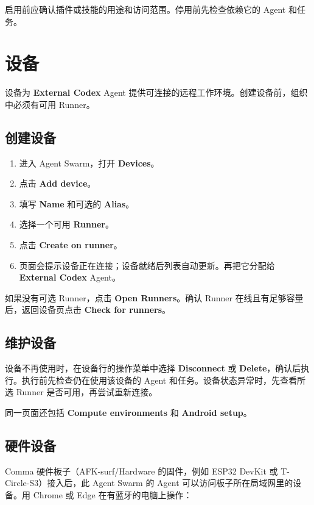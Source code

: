 \documentclass[UTF8,a4paper,11pt]{ctexart}
\begin{document}
启用前应确认插件或技能的用途和访问范围。停用前先检查依赖它的 Agent 和任务。

\section{设备}

设备为 \textbf{External Codex} Agent 提供可连接的远程工作环境。创建设备前，组织中必须有可用 Runner。

\subsection{创建设备}

\begin{enumerate}
  \item 进入 Agent Swarm，打开 \textbf{Devices}。
  \item 点击 \textbf{Add device}。
  \item 填写 \textbf{Name} 和可选的 \textbf{Alias}。
  \item 选择一个可用 \textbf{Runner}。
  \item 点击 \textbf{Create on runner}。
  \item 页面会提示设备正在连接；设备就绪后列表自动更新。再把它分配给 \textbf{External Codex} Agent。
\end{enumerate}

如果没有可选 Runner，点击 \textbf{Open Runners}。确认 Runner 在线且有足够容量后，返回设备页点击 \textbf{Check for runners}。

\subsection{维护设备}

设备不再使用时，在设备行的操作菜单中选择 \textbf{Disconnect} 或 \textbf{Delete}，确认后执行。执行前先检查仍在使用该设备的 Agent 和任务。设备状态异常时，先查看所选 Runner 是否可用，再尝试重新连接。

同一页面还包括 \textbf{Compute environments} 和 \textbf{Android setup}。

\subsection{硬件设备}

Comma 硬件板子（AFK-surf/Hardware 的固件，例如 ESP32 DevKit 或 T-Circle-S3）接入后，此 Agent Swarm 的 Agent 可以访问板子所在局域网里的设备。用 Chrome 或 Edge 在有蓝牙的电脑上操作：
\end{document}
